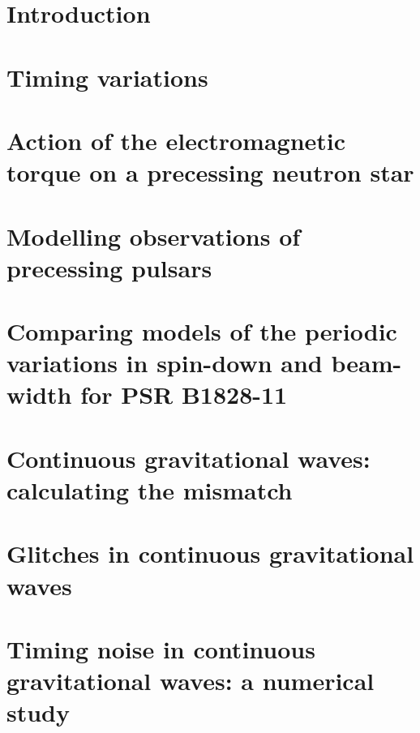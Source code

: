 \documentclass[twoside, 11pt]{thesis}
\begin{document}

\mainmatter

\chapter{Introduction}
\label{sec: neutron star physics}


\chapter{Timing variations}
\label{sec: timing variations}


\chapter{Action of the electromagnetic torque on a precessing neutron star}
\label{sec: rotating frame}


\chapter{Modelling observations of precessing pulsars}
\label{sec: inertial frame}


\chapter{Comparing models of the periodic variations in spin-down
and beam-width for PSR B1828-11}
\label{sec: testing models}


\chapter{Continuous gravitational waves: calculating the mismatch}
\label{sec: intro to cgw}


\chapter{Glitches in continuous gravitational waves}
\label{sec: glitches in cgw}


\chapter{Timing noise in continuous gravitational waves: a numerical study}
\label{sec: timing noise in cgw}

\end{document}

